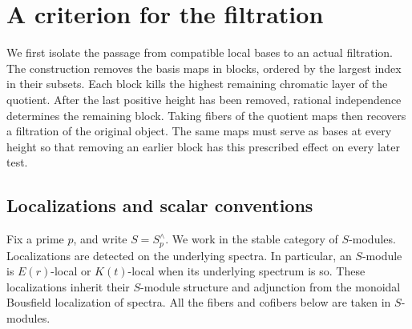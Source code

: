 \section{A criterion for the filtration}
\label{sec:assembly}

We first isolate the passage from compatible local bases to an actual
filtration. The construction removes the basis maps in blocks, ordered
by the largest index in their subsets. Each block kills the highest
remaining chromatic layer of the quotient. After the last positive
height has been removed, rational independence determines the remaining
block. Taking fibers of the quotient maps then recovers a filtration
of the original object. The same maps must serve as bases at every
height so that removing an earlier block has this prescribed effect
on every later test.

\subsection{Localizations and scalar conventions}

Fix a prime \(p\), and write \(S=S_p^\wedge\). We work in the stable
category of \(S\)-modules. Localizations are detected on the underlying
spectra. In particular, an \(S\)-module is \(E(r)\)-local or
\(K(t)\)-local when its underlying spectrum is so. These localizations
inherit their \(S\)-module structure and adjunction from the monoidal
Bousfield localization of spectra. All the fibers and cofibers below
are taken in \(S\)-modules.

